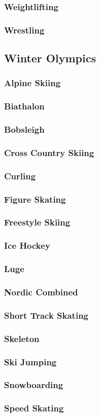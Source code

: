 			\subsubsection{Weightlifting}
			\subsubsection{Wrestling}
			
			\newpage
		\subsection{Winter Olympics}
			\subsubsection{Alpine Skiing}
			\subsubsection{Biathalon}
			\subsubsection{Bobsleigh}
			\subsubsection{Cross Country Skiing}
			\subsubsection{Curling}
			\subsubsection{Figure Skating}
			\subsubsection{Freestyle Skiing}
			\subsubsection{Ice Hockey}
			\subsubsection{Luge}
			\subsubsection{Nordic Combined}
			\subsubsection{Short Track Skating}
			\subsubsection{Skeleton}
			\subsubsection{Ski Jumping}
			\subsubsection{Snowboarding}
			\subsubsection{Speed Skating}